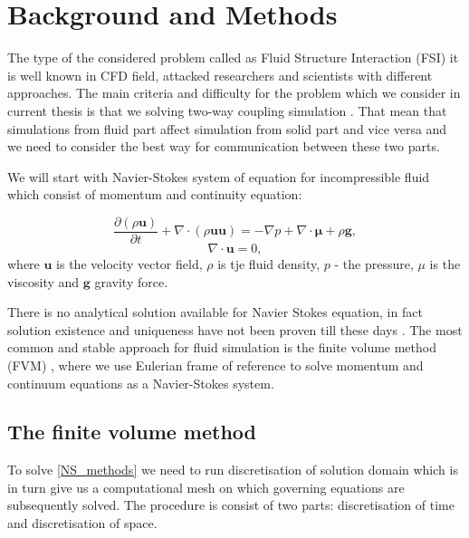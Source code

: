 \chapter{Background and Methods} \label{chap:lit_rev}

The type of the considered problem called as Fluid Structure Interaction (FSI) it is well known in CFD field, attacked researchers and scientists with different approaches. The main criteria and difficulty for the problem which we consider in current thesis is that we solving two-way coupling simulation \cite{benra2011comparison}. That mean that simulations from fluid part affect simulation from solid part and vice versa and we need to consider the best way for communication between these two parts. 

We will start with Navier-Stokes system of equation for incompressible fluid which consist of momentum and continuity equation:

\begin{equation}\label{NS_methods}
\frac{\partial(\rho \mathbf{u})}{\partial t}+\nabla \cdot(\rho \mathbf{u u})=-\nabla p+\nabla \cdot \boldsymbol{\mu}+\rho \mathbf{g},
\end{equation}
\begin{equation}
\nabla \cdot \mathbf{u}=0,
\end{equation}
where $\mathbf{u}$ is the velocity vector field, $\rho$ is tje fluid density, $p$ - the pressure, $\mu$ is the viscosity and $\mathbf{g}$ gravity force.

There is no analytical solution available for Navier Stokes equation, in fact solution existence and uniqueness have not been proven till these days \cite{klay}. The most common and stable approach for fluid simulation is the finite volume method (FVM) \cite{ferziger2002cfd}, where we use Eulerian frame of reference to solve momentum and continuum equations as a Navier-Stokes system.

\section{The finite volume method}
To solve \ref{NS_methods} we need to run discretisation of solution domain which is in turn give us a computational mesh on which governing equations are subsequently solved. The procedure is consist of two parts: discretisation of time and discretisation of space.

